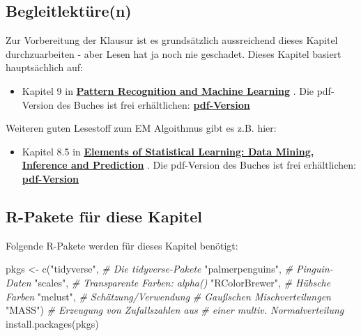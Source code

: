 \documentclass[
  ngerman,
]{book}
\newenvironment{Shaded}{\begin{snugshade}}{\end{snugshade}}
\newcommand{\CommentTok}[1]{\textcolor[rgb]{0.56,0.35,0.01}{\textit{#1}}}
\newcommand{\FunctionTok}[1]{\textcolor[rgb]{0.00,0.00,0.00}{#1}}
\newcommand{\NormalTok}[1]{#1}
\newcommand{\OtherTok}[1]{\textcolor[rgb]{0.56,0.35,0.01}{#1}}
\newcommand{\StringTok}[1]{\textcolor[rgb]{0.31,0.60,0.02}{#1}}
\providecommand{\tightlist}{%
  \setlength{\itemsep}{0pt}\setlength{\parskip}{0pt}}
\begin{document}
\hypertarget{begleitlektuxfcren}{%
\subsection*{Begleitlektüre(n)}\label{begleitlektuxfcren}}

Zur Vorbereitung der Klausur ist es grundsätzlich aussreichend dieses Kapitel durchzuarbeiten - aber Lesen hat ja noch nie geschadet. Dieses Kapitel basiert hauptsächlich auf:

\begin{itemize}
\tightlist
\item
  Kapitel 9 in \href{https://www.microsoft.com/en-us/research/uploads/prod/2006/01/Bishop-Pattern-Recognition-and-Machine-Learning-2006.pdf}{\textbf{Pattern Recognition and Machine Learning}} \citep{book_Bishop2006}.
  Die pdf-Version des Buches ist frei erhältlichen: \href{https://www.microsoft.com/en-us/research/uploads/prod/2006/01/Bishop-Pattern-Recognition-and-Machine-Learning-2006.pdf}{\textbf{pdf-Version}}
\end{itemize}

Weiteren guten Lesestoff zum EM Algoithmus gibt es z.B. hier:

\begin{itemize}
\tightlist
\item
  Kapitel 8.5 in \href{https://web.stanford.edu/~hastie/ElemStatLearn/}{\textbf{Elements of Statistical Learning: Data Mining, Inference and Prediction}} \citep{Elements}.
  Die pdf-Version des Buches ist frei erhältlichen: \href{https://web.stanford.edu/~hastie/ElemStatLearn/}{\textbf{pdf-Version}}
\end{itemize}

\hypertarget{r-pakete-fuxfcr-diese-kapitel}{%
\subsection*{R-Pakete für diese Kapitel}\label{r-pakete-fuxfcr-diese-kapitel}}

Folgende R-Pakete werden für dieses Kapitel benötigt:

\begin{Shaded}
\begin{Highlighting}[]
\NormalTok{pkgs }\OtherTok{\textless{}{-}} \FunctionTok{c}\NormalTok{(}\StringTok{"tidyverse"}\NormalTok{,      }\CommentTok{\# Die tidyverse{-}Pakete}
          \StringTok{"palmerpenguins"}\NormalTok{, }\CommentTok{\# Pinguin{-}Daten}
          \StringTok{"scales"}\NormalTok{,         }\CommentTok{\# Transparente Farben: alpha()}
          \StringTok{"RColorBrewer"}\NormalTok{,   }\CommentTok{\# Hübsche Farben}
          \StringTok{"mclust"}\NormalTok{,         }\CommentTok{\# Schätzung/Verwendung }
                            \CommentTok{\# Gaußschen Mischverteilungen}
          \StringTok{"MASS"}\NormalTok{)           }\CommentTok{\# Erzeugung von Zufallszahlen aus }
                            \CommentTok{\# einer multiv. Normalverteilung}
\FunctionTok{install.packages}\NormalTok{(pkgs)}
\end{Highlighting}
\end{Shaded}
\end{document}
